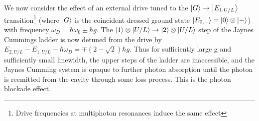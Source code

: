 We now consider the effect of an external drive tuned to the $\ket{G} \rightarrow \ket{E_{1, U/L}}$ transition\footnote{Drive frequencies at multiphoton resonances induce the same effect} (where $\ket{G}$ is the coincident dressed ground state $\ket{E_{0, -}} = \ket{0} \otimes\ket{-}$) with frequency $\omega_D = \hbar \omega_0 \pm \hbar g$.
The $\ket{1} \otimes\ket{U/L} \rightarrow \ket{2} \otimes\ket{U/L}$ step of the Jaynes Cummings ladder is now detuned from the drive by $E_{2, U/L} - E_{1, U/L} - \hbar \omega_D =  \mp(2-\sqrt{2}) \hbar g$. Thus for sufficiently large g and sufficiently small linewidth, the upper steps of the ladder are inaccessible, and the Jaynes Cumming system is opaque to further photon absorption until the photon is reemitted from the cavity through some loss process. This is the photon blockade effect.
